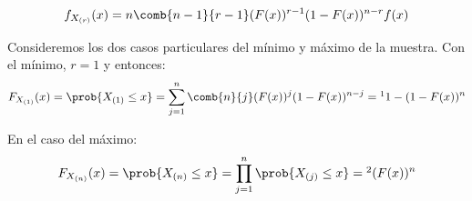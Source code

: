 \begin{problem}[7]
\[ f_{X_{(r)}} (x) = n\comb{n-1}{r-1}(F(x))^{r-1} (1-F(x))^{n-r} f(x) \]

Consideremos los dos casos particulares del mínimo y máximo de la muestra. Con el mínimo, $r=1$ y entonces:
\vspace{-10pt} %
\begin{gather*}
F_{X_{(1)}} (x) =
\prob{X_{(1)} \leq x} =
\sum_{j=1}^n\comb{n}{j}(F(x))^j(1-F(x))^{n-j} =\footnotemark
1 - (1-F(x))^n
\end{gather*}

En el caso del máximo:
\begin{gather*}
F_{X_{(n)}} (x) =
\prob{X_{(n)} \leq x } =
\prod\limits_{j=1}^{n}\prob{X_{(j)} \leq x } =
\footnotemark (F(x))^n
\end{gather*}
\end{problem}

